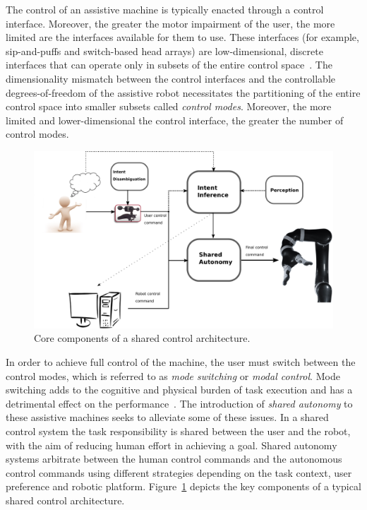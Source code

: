 The control of an assistive machine is typically enacted through a control interface. Moreover, the greater the motor impairment of the user, the more limited are the interfaces available for them to use. These interfaces (for example, sip-and-puffs and switch-based head arrays) are low-dimensional, discrete interfaces that can operate only in subsets of the entire control space~\citep{simpson2008tooth, nuttin2002selection}. 
The dimensionality mismatch between the control interfaces and the controllable degrees-of-freedom of the assistive robot necessitates the partitioning of the entire control space into smaller subsets called \textit{control modes}. Moreover, the more limited and lower-dimensional the control interface, the greater the number of control modes. 
\begin{figure}[t!]
	\includegraphics[keepaspectratio, width = \textwidth]{./figures/Fig2_SharedControl.eps}
	\caption{Core components of a shared control architecture. }
	\label{fig:shared_control}
\end{figure}
In order to achieve full control of the machine, the user must switch between the control modes, which is referred to as \textit{mode switching} or \textit{modal control}. Mode switching adds to the cognitive and physical burden of task execution and has a detrimental effect on the performance~\citep{eftring1999technical}. The introduction of \textit{shared autonomy} to these assistive machines seeks to alleviate some of these issues. In a shared control system the task responsibility is shared between the user and the robot, with the aim of reducing human effort in achieving a goal. Shared autonomy systems arbitrate between the human control commands and the autonomous control commands using different strategies depending on the task context, user preference and robotic platform. Figure~\ref{fig:shared_control} depicts the key components of a  typical shared control architecture.

